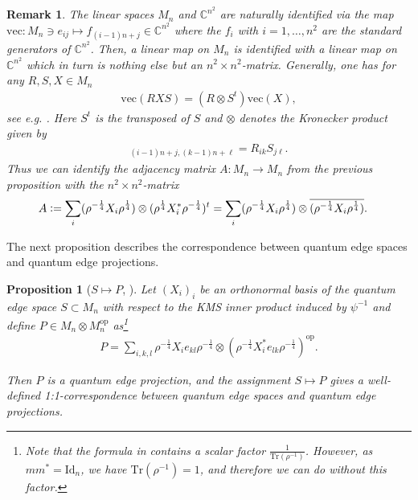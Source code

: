 \documentclass{amsart}
\newtheorem{proposition}[thm]{Proposition}
\newtheorem{remark}[thm]{Remark}
\newcommand{\C}{\mathbb{C}}
\DeclareMathOperator{\op}{op}
\begin{document}
\begin{remark}
    \label{pre::rem:adjacency_matrix_A_as_Kronecker_product}
    The linear spaces $M_n$ and $\C^{n^2}$ are naturally identified via the map $\mathrm{vec}: M_n \ni e_{ij} \mapsto f_{(i-1)n + j} \in \C^{n^2}$ where the $f_i$ with $i=1,\dots,n^2$ are the standard generators of $\C^{n^2}$. Then, a linear map on $M_n$ is identified with a linear map on $\C^{n^2}$ which in turn is nothing else but an $n^2 \times n^2$-matrix. Generally, one has for any $R, S, X \in M_n$
    \begin{align*}
        \mathrm{vec}(RXS) = (R \otimes S^t) \mathrm{vec}(X),
    \end{align*}
    see e.g. \cite[Section 1.1.2]{watrous_theory_2018}.
    Here $S^t$ is the transposed of $S$ and $\otimes$ denotes the Kronecker product given by
    \begin{align*}
        [R \otimes S]_{(i-1)n+j, (k-1)n+\ell} = R_{ik} S_{j \ell}.
    \end{align*}
    Thus we can identify the adjacency matrix $A: M_n \to M_n$ from the previous proposition with the $n^2 \times n^2$-matrix
    \begin{align*}
        A &\vcentcolon= \sum_i (\rho^{-\frac{1}{4}}X_i\rho^{\frac{1}{4}}) \otimes (\rho^{\frac{1}{4}}X_i^*\rho^{-\frac{1}{4}})^t 
            = \sum_i (\rho^{-\frac{1}{4}}X_i\rho^{\frac{1}{4}}) \otimes \overline{(\rho^{-\frac{1}{4}}X_i \rho^{\frac{1}{4}})}.
    \end{align*}
\end{remark}

The next proposition describes the correspondence between quantum edge spaces and quantum edge projections.





\begin{proposition}[{$S\mapsto P$, \cite[Proposition 3.29]{wasilewski_quantum_2024}}]
    \label{pre::prop:S->P}
    Let $(X_i)_i$ be an orthonormal basis of the quantum edge space $S\subset M_n$ with respect to the KMS inner product induced by $\psi^{-1}$ and define $P\in M_n\otimes M_n^{\op}$ as\footnote{Note that the formula in \cite[Proposition 3.29]{wasilewski_quantum_2024} contains a scalar factor $\frac{1}{\mathrm{Tr}(\rho^{-1})}$. However, as $m m^\ast = \mathrm{Id}_n$, we have $\mathrm{Tr}(\rho^{-1}) = 1$, and therefore we can do without this factor.}
    \begin{align*}
        P = \sum_{i,k,l}\rho^{-\frac{1}{4}}X_ie_{kl}\rho^{-\frac{1}{4}}\otimes
        \left(\rho^{-\frac{1}{4}}X_i^*e_{lk}\rho^{-\frac{1}{4}}\right)^{\op}.
    \end{align*}
    
    Then $P$ is a quantum edge projection, and the assignment $S \mapsto P$ gives a well-defined 1:1-correspondence between quantum edge spaces and quantum edge projections.
\end{proposition}
\end{document}
